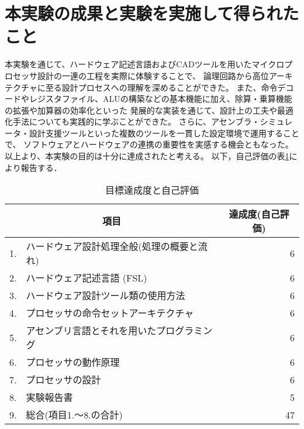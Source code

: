 \documentclass[autodetect-engine,dvi=dvipdfmx,ja=standard,
               a4j,11pt]{bxjsarticle}
\begin{document}
\section{本実験の成果と実験を実施して得られたこと}
本実験を通じて、ハードウェア記述言語およびCADツールを用いたマイクロプロセッサ設計の一連の工程を実際に体験することで、
論理回路から高位アーキテクチャに至る設計プロセスへの理解を深めることができた。
また、命令デコードやレジスタファイル、ALUの構築などの基本機能に加え、除算・乗算機能の拡張や加算器の効率化といった
発展的な実装を通じて、設計上の工夫や最適化手法についても実践的に学ぶことができた。
さらに、アセンブラ・シミュレータ・設計支援ツールといった複数のツールを一貫した設定環境で運用することで、
ソフトウェアとハードウェアの連携の重要性を実感する機会ともなった。以上より、本実験の目的は十分に達成されたと考える。
以下，自己評価の表\ref{tab:目標達成度と自己評価}により報告する．  
\begin{table}[t]
    \caption{目標達成度と自己評価}
    \label{tab:目標達成度と自己評価}
    \begin{center}
    {\small
    \begin{tabular}{rl|r}
    \hline
    \hline
    \multicolumn{2}{c|}{項目} & \multicolumn{1}{c}{達成度(自己評価)} \\
    \hline
    1. & ハードウェア設計処理全般(処理の概要と流れ) & 6 \\
    2. & ハードウェア記述言語 (FSL) & 6 \\
    3. & ハードウェア設計ツール類の使用方法 & 6 \\
    4. & プロセッサの命令セットアーキテクチャ & 6 \\
    5. & アセンブリ言語とそれを用いたプログラミング & 6 \\
    6. & プロセッサの動作原理 & 6 \\
    7. & プロセッサの設計 & 6 \\
    8. & 実験報告書 & 5 \\
    \hline
    9. & 総合(項目1.〜8.の合計) & 47 \\
    \hline
    \end{tabular}
    }
    \end{center}
    \end{table}

\end{document}
